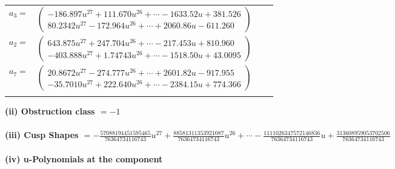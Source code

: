 \documentclass[1p]{elsarticle_modified}
\theoremstyle{definition}
\begin{document}
\begin{tabular}{m{7pt} m{180pt} m{7pt} m{180pt} }
\flushright $a_{3}=$&$\begin{pmatrix}-186.897 u^{27}+111.670 u^{26}+\cdots-1633.52 u+381.526\\80.2342 u^{27}-172.964 u^{26}+\cdots+2060.86 u-611.260\end{pmatrix}$ \\
\flushright $a_{2}=$&$\begin{pmatrix}643.875 u^{27}+247.704 u^{26}+\cdots-217.453 u+810.960\\-403.888 u^{27}+1.74743 u^{26}+\cdots-1518.50 u+43.0095\end{pmatrix}$ \\
\flushright $a_{7}=$&$\begin{pmatrix}20.8672 u^{27}-274.777 u^{26}+\cdots+2601.82 u-917.955\\-35.7010 u^{27}+222.640 u^{26}+\cdots-2384.15 u+774.366\end{pmatrix}$\\&\end{tabular}
\flushleft \textbf{(ii) Obstruction class $= -1$}\\~\\
\flushleft \textbf{(iii) Cusp Shapes $= -\frac{57088194451595465}{76364734116743} u^{27}+\frac{88581311353921087}{76364734116743} u^{26}+\cdots-\frac{1111026347572146836}{76364734116743} u+\frac{313608959053702506}{76364734116743}$}\\~\\
\newpage\renewcommand{\arraystretch}{1}
\flushleft \textbf{(iv) u-Polynomials at the component}\newline \\
\end{document}
